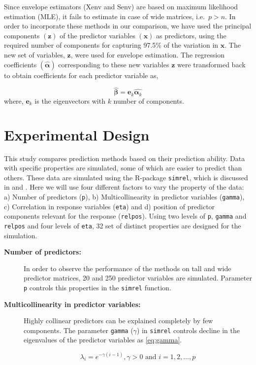 \documentclass[12pt,3p,authoryear]{elsarticle}
\begin{document}
Since envelope estimators (Xenv and Senv) are based on maximum
likelihood estimation (MLE), it fails to estimate in case of wide
matrices, i.e.~\(p > n\). In order to incorporate these methods in our
comparison, we have used the principal components \((\mathbf{z})\) of
the predictor variables \((\mathbf{x})\) as predictors, using the
required number of components for capturing 97.5\% of the variation in
\(\mathbf{x}\). The new set of variables, \(\mathbf{z}\), were used for
envelope estimation. The regression coefficients
\((\hat{\boldsymbol{\alpha}})\) corresponding to these new variables
\(\mathbf{z}\) were transformed back to obtain coefficients for each
predictor variable as,

\[\hat{\boldsymbol{\beta}} = \mathbf{e}_k\hat{\boldsymbol{\alpha}_k}\]
where, \(\mathbf{e}_k\) is the eigenvectors with \(k\) number of
components.

\hypertarget{experimental-design}{%
\section{Experimental Design}\label{experimental-design}}

This study compares prediction methods based on their prediction
ability. Data with specific properties are simulated, some of which are
easier to predict than others. These data are simulated using the
R-package \texttt{simrel}, which is discussed in \citet{saebo2015simrel}
and \citet{Rimal2018}. Here we will use four different factors to vary
the property of the data: a) Number of predictors (\texttt{p}), b)
Multicollinearity in predictor variables (\texttt{gamma}), c)
Correlation in response variables (\texttt{eta}) and d) position of
predictor components relevant for the response (\texttt{relpos}). Using
two levels of \texttt{p}, \texttt{gamma} and \texttt{relpos} and four
levels of \texttt{eta}, 32 set of distinct properties are designed for
the simulation.

\begin{description}
\item[\textbf{Number of predictors:}]
In order to observe the performance of the methods on tall and wide
predictor matrices, 20 and 250 predictor variables are simulated.
Parameter \texttt{p} controls this properties in the \texttt{simrel}
function.
\item[\textbf{Multicollinearity in predictor variables:}]
Highly collinear predictors can be explained completely by few
components. The parameter \texttt{gamma} (\(\gamma\)) in \texttt{simrel}
controls decline in the eigenvalues of the predictor variables as
\eqref{eq:gamma}.

\begin{equation}
  \lambda_i = e^{-\gamma(i - 1)}, \gamma > 0 \text{ and } i = 1, 2, \ldots, p
  \label{eq:gamma}
\end{equation}
\end{description}
\end{document}
